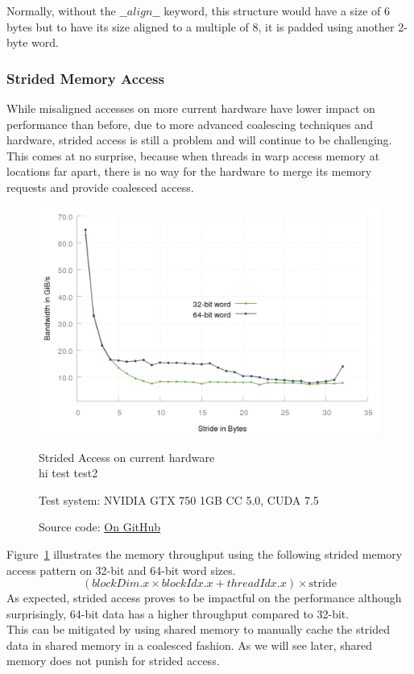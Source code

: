 % 
Normally, without the $\_\_align\_\_$ keyword, this structure would have a size of 6 bytes but to have its
size aligned to a multiple of 8, it is padded using another 2-byte word.\\

\subsubsection{Strided Memory Access}
While misaligned accesses on more current hardware have lower impact on performance than before\cite{pfa_access_global}, due to more advanced coalescing techniques and hardware,
strided access is still a problem and will continue to be challenging.\\
This comes at no surprise, because when threads in warp access memory at locations far apart, there is no way for the hardware to merge its memory requests and provide coalesced access.\\
\begin{figure}[H]
    \centering
    \includegraphics[scale=0.18,natwidth=1200,natheight=800]{media/strided_bandwidth.png}
    \caption{Strided Access on current hardware\\\hspace{\textwidth}hi test test2}
    \caption*{Test system: NVIDIA GTX 750 1GB CC 5.0, CUDA 7.5}
    \caption*{Source code: \href{https://github.com/spotlight0xff/cuda\_paper/code/coalescing\-global/}{On GitHub}\cite{pfa}}
    \label{fig:strided_access}
\end{figure}
Figure~\ref{fig:strided_access} illustrates the memory throughput using the following strided memory access pattern on 32-bit and 64-bit word sizes.\\
$$ (blockDim.x \times blockIdx.x + threadIdx.x) \times \mathrm{stride} $$
As expected, strided access proves to be impactful on the performance although surprisingly,
64-bit data has a higher throughput compared to 32-bit.\\
This can be mitigated by using shared memory to manually cache the strided data in shared memory in a coalesced fashion. As we will see later, shared memory does not punish for strided access.\\
